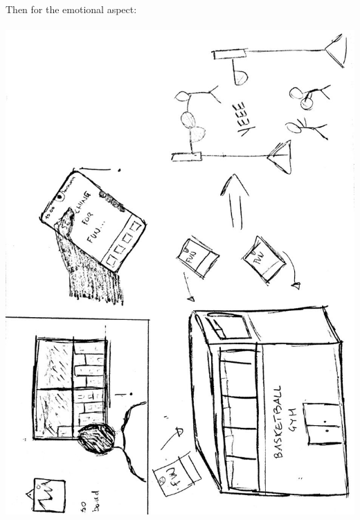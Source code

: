 \documentclass[12pt]{report}
\begin{document}
	Then for the emotional aspect:\\\\
	\includegraphics[scale=0.37]{Emotional.jpg}\break
	\newpage
\end{document}
